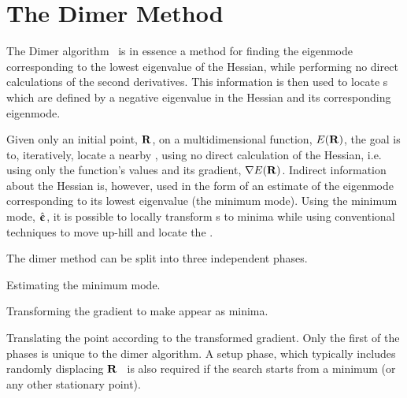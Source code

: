 \section{The Dimer Method}
\label{sec:dimer}
The Dimer algorithm~\cite{dimer-original-1999} is in essence a method for finding the eigenmode corresponding to the lowest eigenvalue of the Hessian, while performing no direct calculations of the second derivatives\cite{hyperdynamics-voter-1997}.
This information is then used to locate s which are defined by a negative eigenvalue in the Hessian and its corresponding eigenmode.

Given only an initial point, ${\mathrm{\mathbf{\bm{R}}}}$, on a multidimensional function, $E({\mathrm{\mathbf{\bm{R}}}})$, the goal is to, iteratively, locate a nearby , using no direct calculation of the Hessian, i.e. using only the function's values and its gradient, $\nabla E({\mathrm{\mathbf{\bm{R}}}})$.
Indirect information about the Hessian is, however, used in the form of an estimate of the eigenmode corresponding to its lowest eigenvalue (the minimum mode).
Using the minimum mode, $\hat{{\mathrm{\mathbf{\bm{\upepsilon}}}}}$, it is possible to locally transform s to minima while using conventional techniques to move up-hill and locate the .

The dimer method can be split into three independent phases.
\item Estimating the minimum mode.
\item Transforming the gradient to make  appear as minima.
\item Translating the point according to the transformed gradient.
\een
Only the first of the phases is unique to the dimer algorithm.
A setup phase, which typically includes randomly displacing ${\mathrm{\mathbf{\bm{R}}}}$~\cite{dimer-sampling-2011} is also required if the search starts from a minimum (or any other stationary point).

